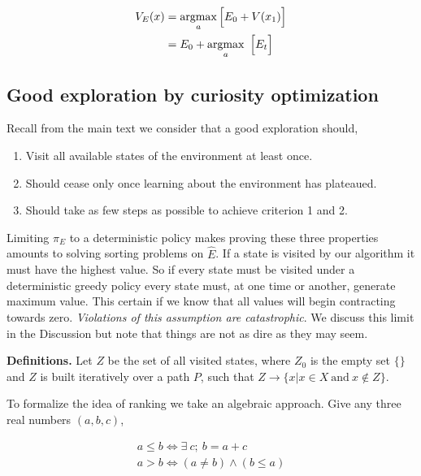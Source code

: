 \begin{equation}
	\label{eq:V_E2} 
	\begin{split}
	V_E(x) &= \operatorname*{argmax}_a \Big [ E_0 + V(x_1) \Big ] \\
		   &= E_0 + \operatorname*{argmax}_a \ \Big [ E_t \Big ] \\
	\end{split}
\end{equation}

\subsection*{Good exploration by curiosity optimization} 

Recall from the main text we consider that a good exploration should,

\begin{enumerate}
  \item Visit all available states of the environment at least once. 
  \item Should cease only once learning about the environment has plateaued. 
  \item Should take as few steps as possible to achieve criterion 1 and 2.
\end{enumerate}

Limiting $\pi_E$ to a deterministic policy makes proving these three properties amounts to solving sorting problems on $\hat E$. If a state is visited by our algorithm it must have the highest value. So if every state must be visited under a deterministic greedy policy every state must, at one time or another, generate maximum value. This certain if we know that all values will begin contracting towards zero. \textit{Violations of this assumption are catastrophic}. We discuss this limit in the Discussion but note that things are not as dire as they may seem.

\textbf{Definitions.} Let $Z$ be the set of all visited states, where $Z_0$ is the empty set $\{\}$ and $Z$ is built iteratively over a path $P$, such that $Z \rightarrow \{x | x \in X\ \text{and}\ x \not\in Z\}$. 

To formalize the idea of ranking we take an algebraic approach. Give any three real numbers $(a,b,c)$,

\begin{align}\label{eq:ineq} 
	a \leq b \Leftrightarrow \exists \ c;\ b = a + c \\
	a > b \Leftrightarrow (a \neq b) \wedge (b \leq a) 
\end{align}

